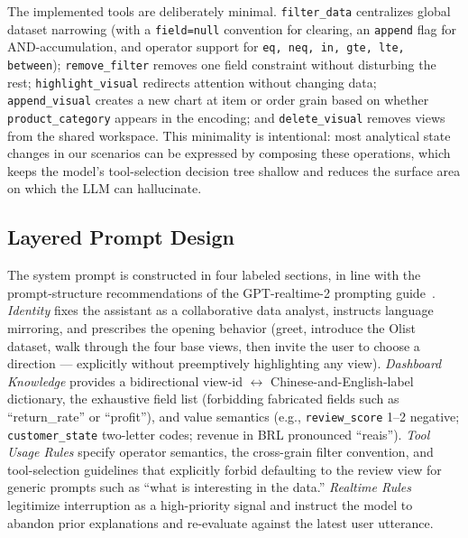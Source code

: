 \documentclass[journal]{IEEEtran}
\begin{document}
\noindent The implemented tools are deliberately minimal. \texttt{filter\_data} centralizes global dataset narrowing (with a \texttt{field=null} convention for clearing, an \texttt{append} flag for AND-accumulation, and operator support for \texttt{eq, neq, in, gte, lte, between}); \texttt{remove\_filter} removes one field constraint without disturbing the rest; \texttt{highlight\_visual} redirects attention without changing data; \texttt{append\_visual} creates a new chart at item or order grain based on whether \texttt{product\_category} appears in the encoding; and \texttt{delete\_visual} removes views from the shared workspace. This minimality is intentional: most analytical state changes in our scenarios can be expressed by composing these operations, which keeps the model's tool-selection decision tree shallow and reduces the surface area on which the LLM can hallucinate.

\subsection{Layered Prompt Design}
The system prompt is constructed in four labeled sections, in line with the prompt-structure recommendations of the GPT-realtime-2 prompting guide~\cite{openai_realtime_prompt}. \emph{Identity} fixes the assistant as a collaborative data analyst, instructs language mirroring, and prescribes the opening behavior (greet, introduce the Olist dataset, walk through the four base views, then invite the user to choose a direction --- explicitly without preemptively highlighting any view). \emph{Dashboard Knowledge} provides a bidirectional view-id $\leftrightarrow$ Chinese-and-English-label dictionary, the exhaustive field list (forbidding fabricated fields such as ``return\_rate'' or ``profit''), and value semantics (e.g., \texttt{review\_score} 1--2 negative; \texttt{customer\_state} two-letter codes; revenue in BRL pronounced ``reais''). \emph{Tool Usage Rules} specify operator semantics, the cross-grain filter convention, and tool-selection guidelines that explicitly forbid defaulting to the review view for generic prompts such as ``what is interesting in the data.'' \emph{Realtime Rules} legitimize interruption as a high-priority signal and instruct the model to abandon prior explanations and re-evaluate against the latest user utterance.
\end{document}
